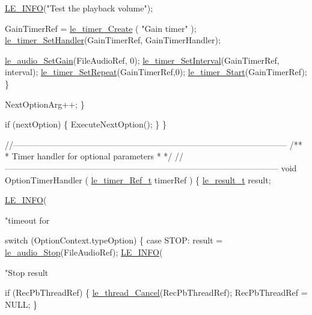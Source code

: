 \begin{DoxyCodeInclude}
{{{{{{{{{{{{{{{            \hyperlink{le__log_8h_a23e6d206faa64f612045d688cdde5808}{LE\_INFO}(\textcolor{stringliteral}{"Test the playback volume"});

            GainTimerRef = \hyperlink{le__timer_8h_aee41169a210378b369f440cf99146522}{le\_timer\_Create}  ( \textcolor{stringliteral}{"Gain timer"} );
            \hyperlink{update_daemon_8c_ac9249ea73392d7d9ffe947ef6829b551}{le\_timer\_SetHandler}(GainTimerRef, GainTimerHandler);

            \hyperlink{le__audio__interface_8h_a65f11540e6af03a3494b6b9be76ba5fc}{le\_audio\_SetGain}(FileAudioRef, 0);
            \hyperlink{le__timer_8h_a0a103d5cef5e83fc9088859d527bbd43}{le\_timer\_SetInterval}(GainTimerRef, interval);
            \hyperlink{watchdog_8c_aa784fef99700de8ffcb27f49d1145746}{le\_timer\_SetRepeat}(GainTimerRef,0);
            \hyperlink{watchdog_8c_a8f0ef9d6af3090467f5a969c799ad25d}{le\_timer\_Start}(GainTimerRef);
        \}

        NextOptionArg++;
    \}

    \textcolor{keywordflow}{if} (nextOption)
    \{
        ExecuteNextOption();
    \}
\}

\textcolor{comment}{//--------------------------------------------------------------------------------------------------}\textcolor{comment}{}
\textcolor{comment}{/**}
\textcolor{comment}{ * Timer handler for optional parameters}
\textcolor{comment}{ *}
\textcolor{comment}{ */}
\textcolor{comment}{//--------------------------------------------------------------------------------------------------}
\textcolor{keywordtype}{void} OptionTimerHandler
(
    \hyperlink{le__timer_8h_a763fa6992488cdce3b5a820817094838}{le\_timer\_Ref\_t} timerRef
)
\{
    \hyperlink{le__basics_8h_a1cca095ed6ebab24b57a636382a6c86c}{le\_result\_t} result;

    \hyperlink{le__log_8h_a23e6d206faa64f612045d688cdde5808}{LE\_INFO}(\textcolor{stringliteral}{"timeout for %

    \textcolor{keywordflow}{switch} (OptionContext.typeOption)
    \{
        \textcolor{keywordflow}{case} STOP:
            result = \hyperlink{le__audio__interface_8h_a4aebc6e8cdc4389c375e93418823af71}{le\_audio\_Stop}(FileAudioRef);
            \hyperlink{le__log_8h_a23e6d206faa64f612045d688cdde5808}{LE\_INFO}(\textcolor{stringliteral}{"Stop result %

            \textcolor{keywordflow}{if} (RecPbThreadRef)
            \{
                \hyperlink{le__thread_8h_a0f1c1b98f354a96e6e31e55a71b58f6a}{le\_thread\_Cancel}(RecPbThreadRef);
                RecPbThreadRef = NULL;
            \}

}}}}}}}}}}}}}}}}}
\end{DoxyCodeInclude}
